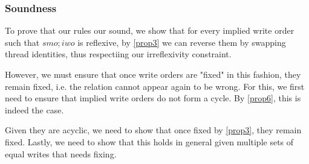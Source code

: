 
    \subsubsection{Soundness}

        To prove that our rules our sound, we show that for every implied write order such that $smo;iwo$ is reflexive, by \ref{prop3} we can reverse them by swapping thread identities, thus respectiing our irreflexivity constraint. 
        
        However, we must ensure that once write orders are "fixed" in this fashion, they remain fixed, i.e. the relation cannot appear again to be wrong. 
        For this, we first need to ensure that implied write orders do not form a cycle. By \ref{prop6}, this is indeed the case. 
        
        Given they are acyclic, we need to show that once fixed by \ref{prop3}, they remain fixed. 
        Lastly, we need to show that this holds in general given multiple sets of equal writes that needs fixing.  

